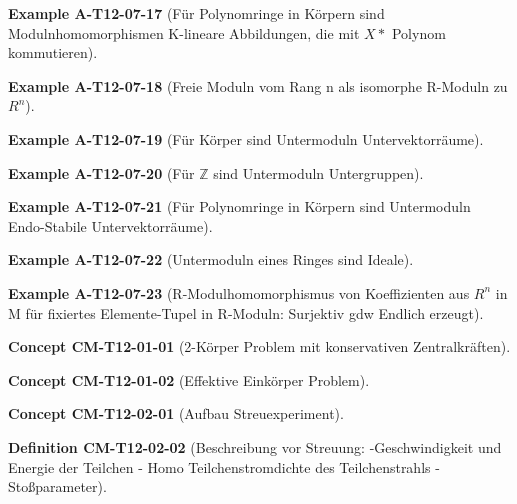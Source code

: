 \documentclass[10pt, letterpaper]{article}
\newcommand{\Z}{\mathbb{Z}}
\newcommand{\CustomHeading}[3]{%
  \par\medskip\noindent%
  \textbf{#1 #2} \textnormal{(#3)}.\enskip%
}
\newenvironment{DEF}[2]{\CustomHeading{Definition}{#1}{#2}}{}
\newenvironment{EXA}[2]{\CustomHeading{Example}{#1}{#2}}{}
\newenvironment{CONC}[2]{\CustomHeading{Concept}{#1}{#2}}{}
\begin{document}
\begin{EXA}{A-T12-07-17}{Für Polynomringe in Körpern sind Modulnhomomorphismen K-lineare Abbildungen, die mit $X*$ Polynom kommutieren}
\end{EXA}

\begin{EXA}{A-T12-07-18}{Freie Moduln vom Rang n als isomorphe R-Moduln zu $R^n$}
\end{EXA}

\begin{EXA}{A-T12-07-19}{Für Körper sind Untermoduln Untervektorräume}
\end{EXA}

\begin{EXA}{A-T12-07-20}{Für $\Z$ sind Untermoduln Untergruppen}
\end{EXA}

\begin{EXA}{A-T12-07-21}{Für Polynomringe in Körpern sind Untermoduln Endo-Stabile Untervektorräume}
\end{EXA}

\begin{EXA}{A-T12-07-22}{Untermoduln eines Ringes sind Ideale}
\end{EXA}

\begin{EXA}{A-T12-07-23}{R-Modulhomomorphismus von Koeffizienten aus $R^n$ in M für fixiertes Elemente-Tupel in R-Moduln: Surjektiv gdw Endlich erzeugt}
\end{EXA}

\begin{CONC}{CM-T12-01-01}{2-Körper Problem mit konservativen Zentralkräften}
\end{CONC}

\begin{CONC}{CM-T12-01-02}{Effektive Einkörper Problem}
\end{CONC}

\begin{CONC}{CM-T12-02-01}{Aufbau Streuexperiment}
\end{CONC}

\begin{DEF}{CM-T12-02-02}{Beschreibung vor Streuung:
-Geschwindigkeit und Energie der Teilchen
- Homo Teilchenstromdichte des Teilchenstrahls
- Stoßparameter}
\end{DEF}
\end{document}
